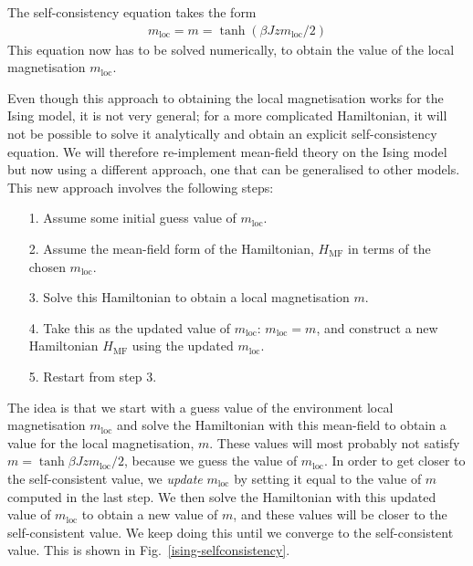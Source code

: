 \documentclass{article}
\begin{document}
The self-consistency equation takes the form
\begin{equation}\begin{aligned}
	m_\text{loc} = m = \tanh \left(\beta Jzm_\text{loc}/2\right)
\end{aligned}\end{equation}
This equation now has to be solved numerically, to obtain the value of the local magnetisation \(m_\text{loc}\). 

Even though this approach to obtaining the local magnetisation works for the Ising model, it is not very general; for a more complicated Hamiltonian, it will not be possible to solve it analytically and obtain an explicit self-consistency equation. We will therefore re-implement mean-field theory on the Ising model but now using a different approach, one that can be generalised to other models. This new approach involves the following steps:
\begin{itemize}
	\item[1.] Assume some initial guess value of \(m_\text{loc}\).
	\item[2.] Assume the mean-field form of the Hamiltonian, \(H_\text{MF}\) in terms of the chosen \(m_\text{loc}\).
	\item[3.] Solve this Hamiltonian to obtain a local magnetisation \(m\).
	\item[4.] Take this as the updated value of \(m_\text{loc}\): \(m_\text{loc} = m\), and construct a new Hamiltonian \(H_\text{MF}\) using the updated \(m_\text{loc}\).
	\item[5.] Restart from step 3.
\end{itemize}
The idea is that we start with a guess value of the environment local magnetisation \(m_\text{loc}\) and solve the Hamiltonian with this mean-field to obtain a value for the local magnetisation, \(m\). These values will most probably not satisfy \(m = \tanh \beta J z m_\text{loc}/2\), because we guess the value of \(m_\text{loc}\). In order to get closer to the self-consistent value, we {\it update} \(m_\text{loc}\) by setting it equal to the value of \(m\) computed in the last step. We then solve the Hamiltonian with this updated value of \(m_\text{loc}\) to obtain a new value of \(m\), and these values will be closer to the self-consistent value. We keep doing this until we converge to the self-consistent value. This is shown in Fig.~\ref{ising-selfconsistency}.
\end{document}
